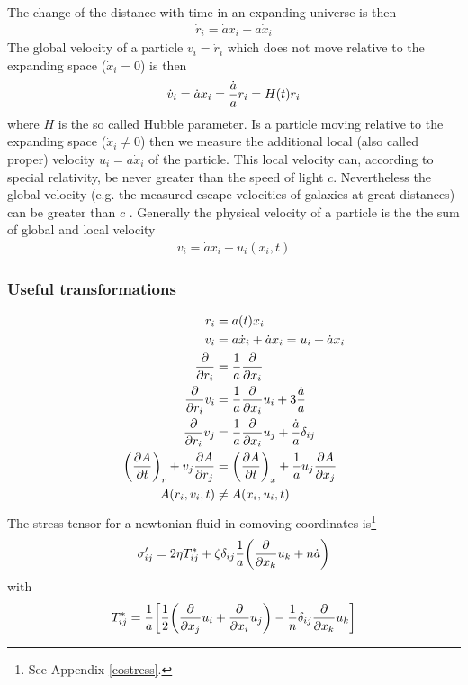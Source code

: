 The change of the distance with time in an expanding universe is then
\begin{align}
\dot{r}_i = \dot{a} x_i + a \dot{x}_i  
\end{align}
The global velocity of a particle $v_i = \dot{r}_i$ which does not move 
relative to the expanding space ($\dot{x}_i = 0$) is then
\begin{align}
\dot{v}_i = \dot{a} x_i = \frac{\dot{a}}{a} r_i = H(t) r_i 
\end{align}
where $H$ is the so called Hubble parameter. Is a particle moving relative to
the expanding space ($\dot{x}_i \neq 0$) then we measure the additional 
local (also called proper) velocity $u_i = a \dot{x}_i$ of the particle. This local
velocity can, according to special relativity, be never greater than the speed of light
$c$. Nevertheless the global velocity (e.g. the measured escape velocities of galaxies at 
great distances) can be greater than $c$ \citep{Davis2004}. Generally the physical velocity 
of a particle is the the sum of global and local velocity
\begin{align}
v_i = \dot{a} x_i + u_i (x_i,t)
\end{align}



\subsubsection{Useful transformations}
\begin{align}
r_i&=a(t) x_i\\
v_i&= a \dot{x}_i + \dot{a} x_i = u_i + \dot{a} x_i\\
\frac{\partial}{\partial r_i}&=\frac{1}{a}\frac{\partial}{\partial x_i}\\
\frac{\partial}{\partial r_i}v_i&=\frac{1}{a}\frac{\partial}{\partial x_i}u_i+3\frac{\dot{a}}{a}\label{eq:cotrans4}\\
\frac{\partial}{\partial r_i}v_j&=\frac{1}{a}\frac{\partial}{\partial x_i}u_j + \frac{\dot{a}}{a}\delta_{ij} \label{eq:cotrans5}\\
{ \left( \frac{\partial A}{\partial t} \right) }_r+v_j \frac{\partial A}{\partial r_j} &= 
{ \left( \frac{\partial A}{\partial t} \right) }_x+\frac{1}{a} u_j \frac{\partial A}{\partial
x_j}\\
A(r_i,v_i,t) &\neq A(x_i,u_i,t)
\end{align}
The stress tensor for a newtonian fluid in comoving coordinates is\footnote{See
Appendix \ref{costress}.}
\begin{align}
\sigma'_{ij}=2\eta T^*_{ij}+\zeta\delta_{ij}\frac{1}{a}{ \left( \frac{\partial}{\partial x_k}u_k+n\dot{a} \right) }
\end{align}
with 
\begin{align}
T^*_{ij}=\frac{1}{a}{ \left[ \frac{1}{2}{ \left( \frac{\partial}{\partial x_j}u_i+\frac{\partial}{\partial x_i}u_j \right) }
-\frac{1}{n}\delta_{ij}\frac{\partial}{\partial x_k}u_k \right] }
\end{align}

